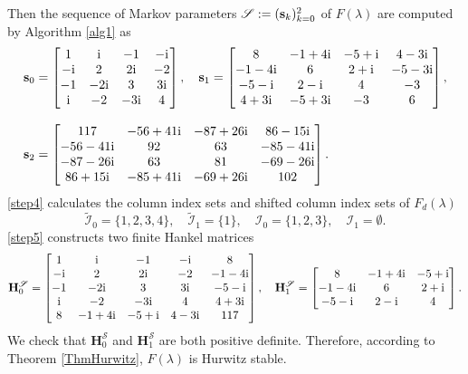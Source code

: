 \documentclass[12pt,reqno]{amsart}
\theoremstyle{plain}
\numberwithin{equation}{section}
\theoremstyle{remark}
\def\wtilde{\widetilde} \def\what{\widehat}
\begin{document}
Then the sequence of Markov parameters $\mathscr S:=({\bf s}_k)_{k=0}^2$ of $F(\lambda)$ are computed by Algorithm \ref{alg1} as
\begin{align*}
&{\bf s}_0=\begin{bmatrix}1 & {\rm i}& -1 & - {\rm i}\\- {\rm i}& 2 & 2 {\rm i}& -2\\-1 & - 2 {\rm i}& 3 & 3 {\rm i}\\{\rm i}& -2 & - 3 {\rm i}& 4\end{bmatrix},\quad {\bf s}_1= 
\begin{bmatrix}8 & -1 + 4 {\rm i}& -5 + {\rm i}& 4 - 3 {\rm i}\\-1 - 4 {\rm i}& 6 & 2 + {\rm i}& -5 - 3 {\rm i}\\-5 - {\rm i}& 2 - {\rm i}& 4 & -3\\4 + 3 {\rm i}& -5 + 3 {\rm i}& -3 & 6\end{bmatrix},\\[3mm]
& {\bf s}_2=\begin{bmatrix}117 & -56 + 41 {\rm i}& -87 + 26 {\rm i}& 86 - 15 {\rm i}\\-56 - 41 {\rm i}& 92 & 63 & -85 - 41 {\rm i}\\-87 - 26 {\rm i}& 63 & 81 & -69 - 26 {\rm i}\\86 + 15 {\rm i}& -85 + 41 {\rm i}& -69 + 26 {\rm i}& 102\end{bmatrix}.
\end{align*}
\ref{step4} calculates the column index sets and shifted column index sets of $F_d(\lambda)$  
$$\wtilde{\mathcal I}_{0}=\{1,2,3,4\},\quad \wtilde{\mathcal I}_{1}=\{1\},\quad  \mathcal I_{0}=\{1,2,3\},\quad  \mathcal I_{1}=\emptyset.$$
 \ref{step5}  constructs two finite Hankel matrices
$$
\mathbf{H}_{0}^{\mathscr{S}} = 
\begin{bmatrix}1 & {\rm i}& -1 & - {\rm i}& 8\\- {\rm i}& 2 & 2 {\rm i}& -2 & -1 - 4 {\rm i}\\-1 & - 2 {\rm i}& 3 & 3 {\rm i}& -5 - {\rm i}\\{\rm i}& -2 & - 3 {\rm i}& 4 & 4 + 3 {\rm i}\\8 & -1 + 4 {\rm i}& -5 + {\rm i}& 4 - 3 {\rm i}& 117\end{bmatrix},\quad\mathbf{H}_{1}^{\mathscr{S}}=
\begin{bmatrix}8 & -1 + 4 {\rm i}& -5 + {\rm i}\\-1 - 4 {\rm i}& 6 & 2 + {\rm i}\\-5 - {\rm i}& 2 - {\rm i}& 4\end{bmatrix}.
$$
We check that $\mathbf{H}_{0}^{\mathscr{S}}$ and $\mathbf{H}_{1}^{\mathscr{S}}$ are both positive definite.
Therefore, according to Theorem \ref{ThmHurwitz}, $F(\lambda)$ is Hurwitz stable.
\end{document}
